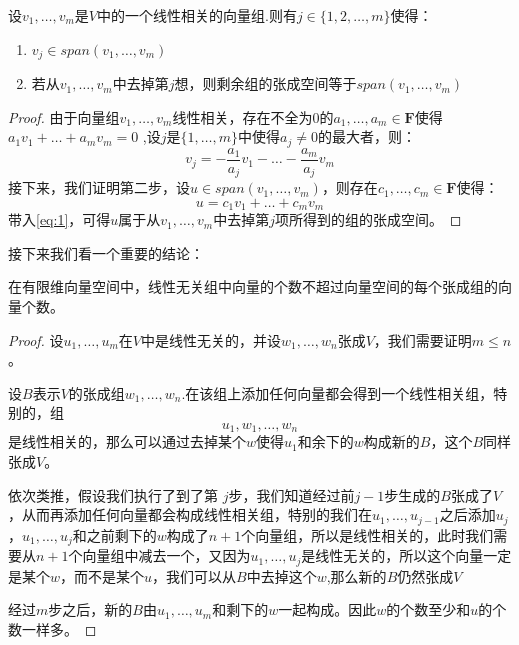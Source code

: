 \documentclass[10pt,a4paper,UTF8]{article}
\begin{document}
\begin{theorem}[线性相关性引理]
设\(v_{1},\ldots ,v_{m}\)是\(V\)中的一个线性相关的向量组.则有\(j\in \{1,2,\ldots ,m\}\)使得：
\begin{enumerate}
\item \(v_{j} \in span(v_{1},\ldots ,v_{m})\)
\item 若从\(v_{1},\ldots ,v_{m}\)中去掉第\(j\)想，则剩余组的张成空间等于\(span(v_{1},\ldots ,v_{m})\)
\end{enumerate}
\end{theorem}
\begin{proof}
由于向量组\(v_{1},\ldots ,v_{m}\)线性相关，存在不全为\(0\)的\(a_{1},\ldots ,a_{m} \in \mathbf{F}\)使得 \(a_{1}v_{1} + \ldots + a_{m}v_{m} = 0\) ,设\(j\)是\(\{1,\ldots,m\}\)中使得\(a_{j}\neq 0\)的最大者，则：
\begin{equation}
\label{eq:1}
v_{j} = -\frac{a_{1}}{a_{j}} v_{1} - \ldots  - \frac{a_{m}}{a_{j}}v_{m}
\end{equation}
接下来，我们证明第二步，设\(u\in span(v_{1},\ldots ,v_{m})\)，则存在\(c_{1},\ldots ,c_{m} \in \mathbf{F}\)使得：\[u = c_{1}v_{1} + \ldots + c_{m}v_{m}\] 带入\ref{eq:1}，可得\(u\)属于从\(v_{1},\ldots ,v_{m}\)中去掉第\(j\)项所得到的组的张成空间。
\end{proof}

接下来我们看一个重要的结论：
\begin{theorem}
在有限维向量空间中，线性无关组中向量的个数不超过向量空间的每个张成组的向量个数。
\end{theorem}

\begin{proof}
设\(u_{1},\ldots,u_{m}\)在\(V\)中是线性无关的，并设\(w_{1},\ldots ,w_{n}\)张成\(V\)，我们需要证明\(m \leq n\)。

设\(B\)表示\(V\)的张成组\(w_{1},\ldots ,w_{n}\).在该组上添加任何向量都会得到一个线性相关组，特别的，组\[u_{1},w_{1},\ldots ,w_{n}\]是线性相关的，那么可以通过去掉某个\(w\)使得\(u_{1}\)和余下的\(w\)构成新的\(B\)，这个\(B\)同样张成\(V\)。

依次类推，假设我们执行了到了第 \(j\)步，我们知道经过前\(j-1\)步生成的\(B\)张成了\(V\)，从而再添加任何向量都会构成线性相关组，特别的我们在\(u_{1},\ldots ,u_{j-1}\)之后添加\(u_{j}\)，\(u_{1},\ldots ,u_{j}\)和之前剩下的\(w\)构成了\(n+1\)个向量组，所以是线性相关的，此时我们需要从\(n+1\)个向量组中减去一个，又因为\(u_{1},\ldots ,u_{j}\)是线性无关的，所以这个向量一定是某个\(w\)，而不是某个\(u\)，我们可以从\(B\)中去掉这个\(w\),那么新的\(B\)仍然张成\(V\)

经过\(m\)步之后，新的\(B\)由\(u_{1},\ldots ,u_{m}\)和剩下的\(w\)一起构成。因此\(w\)的个数至少和\(u\)的个数一样多。
\end{proof}
\end{document}

